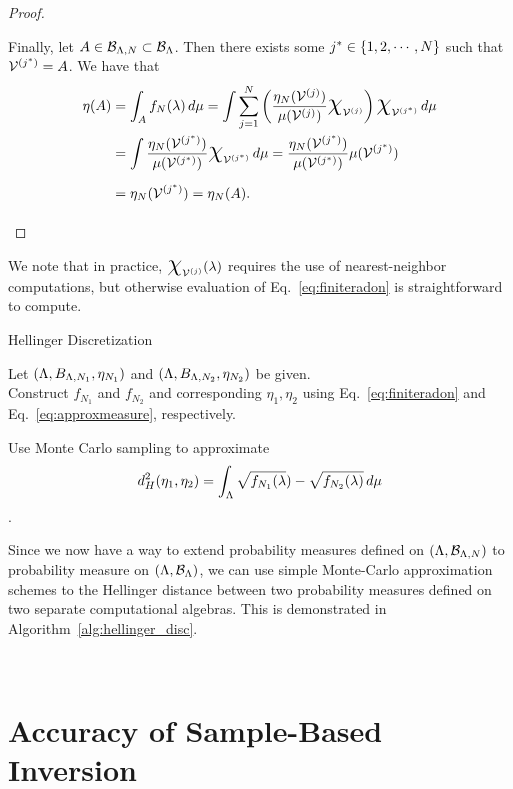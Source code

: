 \begin{proof}
\begin{itemize}
\noindent Finally, let $A\in\mathcal{B}_{{\Lambda}, N}\subset \mathcal{B}_{\Lambda}$. 
Then there exists some $j^* \in \left\{1,2, \cdots, N\right\}$ such that $\mathcal{V}^{(j^*)} = A$. 
We have that
\begin{equation*}
\begin{split}
\eta (A) &= \int_A f_N (\param) \, d\mu
=  \int \sum_{j=1}^{N} \left ( \frac{\eta_N (\VV^{(j)}) }{\mu (\VV^{(j)})} \Chi_{\VV^{(j)}}\right ) \Chi_{\VV^{(j^*)}} \, d\mu \\
&= \int \frac{\eta_N (\VV^{(j^*)}) }{\mu (\VV^{(j^*)})} \Chi_{\VV^{(j^*)}} \, d\mu
= \frac{\eta_N (\VV^{(j^*)}) }{\mu (\VV^{(j^*)})} \mu (\VV^{(j^*)}) \\
&= \eta_N (\VV^{(j^*)}) = \eta_N (A). 
\end{split}
\end{equation*}

\end{itemize}
\end{proof}

We note that in practice, $\Chi_{\VV^{(j)}} (\param)$ requires the use of nearest-neighbor computations, but otherwise evaluation of Eq.~\eqref{eq:finiteradon} is straightforward to compute.

\begin{algorithm}
\DontPrintSemicolon
\caption{Hellinger Discretization}
\label{alg:hellinger_disc}
Let $({\Lambda}, B_{{\Lambda}, N_1}, \eta_{N_1} )$ and $({\Lambda}, B_{{\Lambda}, N_2}, \eta_{N_2} )$ be given.\\
 
Construct $f_{N_1}$ and $f_{N_2}$ and corresponding $\eta_1, \eta_2$ using Eq.~\eqref{eq:finiteradon} and Eq.~\eqref{eq:approxmeasure}, respectively.

Use Monte Carlo sampling to approximate
$$ d^2_H(\eta_1, \eta_2) = \int_{\Lambda} \sqrt{f_{N_1}(\lambda}) - \sqrt{f_{N_2}(\lambda)} \, d\mu $$.
\end{algorithm}

Since we now have a way to extend probability measures defined on $({\Lambda}, \mathcal{B}_{{\Lambda}, N})$ to  probability measure on $({\Lambda}, \mathcal{B}_{{\Lambda}})$, we can use simple Monte-Carlo approximation schemes to the Hellinger distance between two probability measures defined on two separate computational algebras. 
This is demonstrated in Algorithm~\ref{alg:hellinger_disc}.


\
\section{Accuracy of Sample-Based Inversion}

